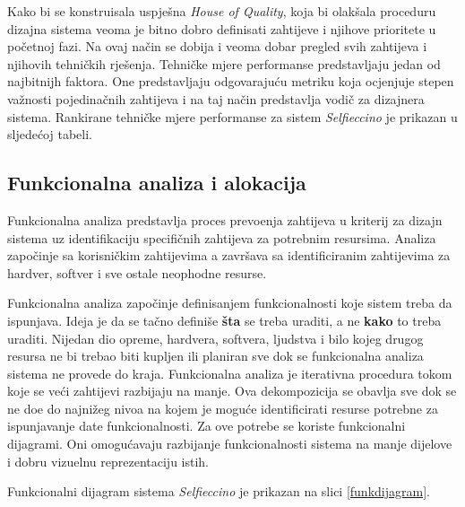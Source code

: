 \documentclass[12pt]{article}
\begin{document}
Kako bi se konstruisala uspje\v{s}na \textit{House of Quality}, koja bi olak\v{s}ala proceduru dizajna sistema veoma je bitno dobro definisati zahtijeve i njihove prioritete u po\v{c}etnoj fazi. Na ovaj na\v{c}in se dobija i veoma dobar pregled svih zahtijeva i njihovih tehni\v{c}kih rje\v{s}enja. Tehni\v{c}ke mjere performanse predstavljaju jedan od najbitnijh faktora. One predstavljaju odgovaraju\'cu metriku koja ocjenjuje stepen va\v{z}nosti pojedina\v{c}nih zahtijeva i na taj na\v{c}in predstavlja vodi\v{c} za dizajnera sistema. Rankirane tehni\v{c}ke mjere performanse za sistem \textit{Selfieccino} je prikazan u sljede\'coj tabeli.

\subsection{Funkcionalna analiza i alokacija}
Funkcionalna analiza predstavlja proces prevo\dj enja zahtijeva u kriterij za dizajn sistema uz identifikaciju specifi\v{c}nih zahtijeva za potrebnim resursima. Analiza zapo\v{c}inje sa korisni\v{c}kim zahtijevima a zavr\v{s}ava sa identificiranim zahtijevima za hardver, softver i sve ostale neophodne resurse.

Funkcionalna analiza zapo\v{c}inje definisanjem funkcionalnosti koje sistem treba da ispunjava. Ideja je da se ta\v{c}no defini\v{s}e \textbf{\v{s}ta} se treba uraditi, a ne \textbf{kako} to treba uraditi. Nijedan dio opreme, hardvera, softvera, ljudstva i bilo kojeg drugog resursa ne bi trebao biti kupljen ili planiran sve dok se funkcionalna analiza sistema ne provede do kraja. Funkcionalna analiza je iterativna procedura tokom koje se ve\'ci zahtijevi razbijaju na manje. Ova dekompozicija se obavlja sve dok se ne do\dj e do najni\v{z}eg nivoa na kojem je mogu\'ce identificirati resurse potrebne za ispunjavanje date funkcionalnosti. Za ove potrebe se koriste funkcionalni dijagrami. Oni omogu\'cavaju razbijanje funkcionalnosti sistema na manje dijelove i dobru vizuelnu reprezentaciju istih. 

Funkcionalni dijagram sistema \textit{Selfieccino} je prikazan na slici \ref{funkdijagram}.


 
 
 
\newpage
\renewcommand{\refname}{Izvori}

\nocite{*}

\end{document}
